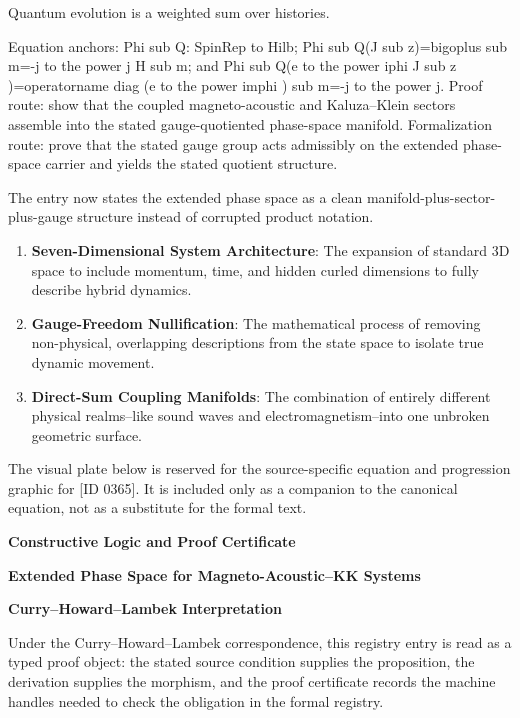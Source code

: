 Quantum evolution is a weighted sum over histories.

Equation anchors: Phi sub Q: SpinRep to Hilb; Phi sub Q(J sub z)=bigoplus sub m=-j to the power j H sub m; and Phi sub Q(e to the power iphi J sub z )=operatorname diag (e to the power imphi ) sub m=-j to the power j. Proof route: show that the coupled magneto-acoustic and Kaluza--Klein sectors assemble into the stated gauge-quotiented phase-space manifold. Formalization route: prove that the stated gauge group acts admissibly on the extended phase-space carrier and yields the stated quotient structure.

The entry now states the extended phase space as a clean manifold-plus-sector-plus-gauge structure instead of corrupted product notation.
\endgroup

\begin{enumerate}[leftmargin=1.6em,itemsep=6pt,topsep=4pt]
\item \textbf{Seven-Dimensional System Architecture}: The expansion of standard 3D space to include momentum, time, and hidden curled dimensions to fully describe hybrid dynamics.
\item \textbf{Gauge-Freedom Nullification}: The mathematical process of removing non-physical, overlapping descriptions from the state space to isolate true dynamic movement.
\item \textbf{Direct-Sum Coupling Manifolds}: The combination of entirely different physical realms--like sound waves and electromagnetism--into one unbroken geometric surface.
\end{enumerate}

\begingroup\footnotesize\sloppy
The visual plate below is reserved for the source-specific equation and progression graphic for [ID 0365]. It is included only as a companion to the canonical equation, not as a substitute for the formal text.
\par\endgroup
\ifTZPDarkEdition
{}
\fi

\clearpage
\begingroup\tzpsupportsetup
\noindent\textbf{\fontsize{10.8pt}{12.8pt}\selectfont [ID 0365] Constructive Logic and Proof Certificate}\par
\noindent\textbf{\fontsize{10pt}{12pt}\selectfont Extended Phase Space for Magneto-Acoustic--KK Systems}\par
\vspace{0.45em}
\begingroup
\footnotesize
\setlength{\parskip}{0.22em}
\setlength{\parindent}{0pt}
\noindent\textbf{Curry--Howard--Lambek Interpretation}\par
Under the Curry--Howard--Lambek correspondence, this registry entry is read as a typed proof
object: the stated source condition supplies the proposition, the derivation supplies the
morphism, and the proof certificate records the machine handles needed to check the obligation
in the formal registry.

